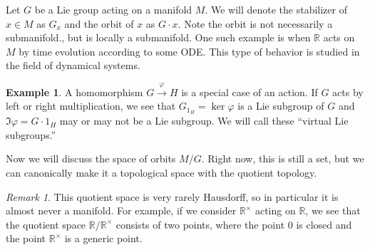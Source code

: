 \documentclass[leqno, openany]{memoir}
\theoremstyle{definition}
\newtheorem{exm}[thm]{Example}
\theoremstyle{remark}
\newtheorem{rmk}[thm]{Remark}
\theoremstyle{plain}
\theoremstyle{definition}
\theoremstyle{remark}
\newcommand{\R}{\mathbb{R}}
\begin{document}
Let $G$ be a Lie group acting on a manifold $M$. We will denote the stabilizer
of $x \in M$ as $G_x$ and the orbit of $x$ as $G \cdot x$. Note the orbit is
not necessarily a submanifold., but is locally a submanifold. One such example
is when $\R$ acts on $M$ by time evolution according to some ODE. This type of
behavior is studied in the field of dynamical systems.

\begin{exm} A homomorphism $G \xrightarrow{\varphi} H$ is a special case of an
    action. If $G$ acts by left or right multiplication, we see that $G_{1_H} =
    \ker \varphi$ is a Lie subgroup of $G$ and $\Im \varphi = G \cdot 1_H$ may
    or may not be a Lie subgroup. We will call these ``virtual Lie subgroups.''
\end{exm}

Now we will discuss the space of orbits $M / G$. Right now, this is still a
set, but we can canonically make it a topological space with the quotient
topology.

\begin{rmk} This quotient space is very rarely Hausdorff, so in particular it
    is almost never a manifold. For example, if we consider $\R^{\times}$
    acting on $\R$, we see that the quotient space $\R / \R^{\times}$ consists
    of two points, where the point $0$ is closed and the point $\R^{\times}$ is
    a generic point.  \end{rmk}
\end{document}
